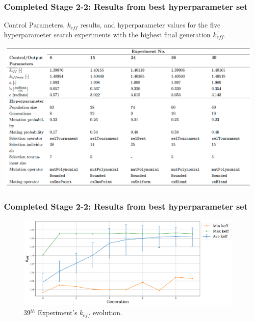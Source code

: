 
\begin{frame}
    \frametitle{Completed Stage 2-2: Results from best hyperparameter set}
    \begin{table}
        \caption{Control Parameters, $k_{eff}$ results, and hyperparameter values for 
        the five hyperparameter search experiments with the highest final generation 
        $\overline{k_{eff}}$.}
        \includegraphics[width=0.85\linewidth]{figures/rollo-demo-best.png} 
    \end{table}
\end{frame}

\begin{frame}
    \frametitle{Completed Stage 2-2: Results from best hyperparameter set}
    \begin{figure}[]
        \centering
        \includegraphics[width=\linewidth]{../docs/figures/keff_conv_39.png}
        \caption{39$^{th}$ Experiment's $k_{eff}$ evolution.}
    \end{figure}
\end{frame}

